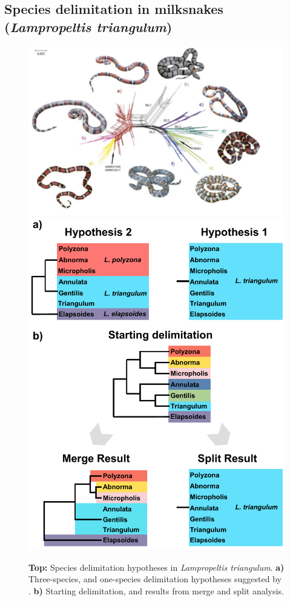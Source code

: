 \documentclass[A4]{article1}
\begin{document}
\newpage
\subsection{Species delimitation in milksnakes (\textit{Lampropeltis triangulum})}

\begin{figure}
    \centering %
    \includegraphics[scale=0.5]{figs/miksnakes} %
    \includegraphics[scale=0.5]{figs/fig-miksnakes-results} %
    
    \caption{\textbf{Top:} Species delimitation hypotheses in \textit{Lampropeltis triangulum}.
    \textbf{a)} Three-species, and one-species delimitation hypotheses suggested by
    \citet{Chambers2020}.  \textbf{b)} Starting delimitation, and results from merge and
    split analysis. \\ %
} \label{fig:milksnake}
\end{figure} 
\end{document}
